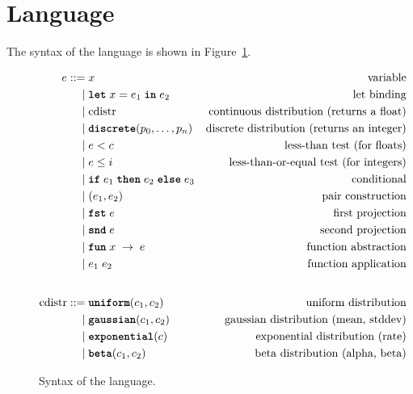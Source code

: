 \documentclass[acmsmall,screen,dvipsnames,x11names,nonacm,anonymous,review]{acmart}
\newcommand{\letkw}{\text{\ttfamily\bfseries let}}
\newcommand{\inkw}{\text{\ttfamily\bfseries in}}
\newcommand{\ifkw}{\text{\ttfamily\bfseries if}}
\newcommand{\thenkw}{\text{\ttfamily\bfseries then}}
\newcommand{\elsekw}{\text{\ttfamily\bfseries else}}
\newcommand{\uniform}{\text{\ttfamily\bfseries uniform}}
\newcommand{\discrete}{\text{\ttfamily\bfseries discrete}}
\newcommand{\gaussian}{\text{\ttfamily\bfseries gaussian}}
\newcommand{\exponential}{\text{\ttfamily\bfseries exponential}}
\newcommand{\betafn}{\text{\ttfamily\bfseries beta}} %
\newcommand{\fstkw}{\text{\ttfamily\bfseries fst}}
\newcommand{\sndkw}{\text{\ttfamily\bfseries snd}}
\newcommand{\funkw}{\text{\ttfamily\bfseries fun}}
\newcommand{\CDice}{\text{\scshape CDice}\xspace}
\begin{document}
\section{Language}

The syntax of the \CDice language is shown in Figure~\ref{fig:grammar}.

\begin{figure}[h]
\begin{align*}
e ::= &\; x                               & \text{variable} \\
    | &\; \letkw \; x = e_1\; \inkw \; e_2  & \text{let binding} \\
    | &\; \text{cdistr}                   & \text{continuous distribution (returns a float)} \\
    | &\; \discrete(p_0, \ldots, p_{n})      & \text{discrete distribution (returns an integer)} \\
    | &\; e < c                           & \text{less-than test (for floats)} \\
    | &\; e \leq i                           & \text{less-than-or-equal test (for integers)} \\
    | &\; \ifkw \; e_1\; \thenkw \; e_2\; \elsekw \; e_3 & \text{conditional} \\
    | &\; (e_1, e_2)                      & \text{pair construction} \\
    | &\; \fstkw \; e                       & \text{first projection} \\
    | &\; \sndkw \; e                       & \text{second projection} \\
    | &\; \funkw \; x \; \rightarrow \; e    & \text{function abstraction} \\
    | &\; e_1 \; e_2                      & \text{function application} \\
    \\[1ex] %
\text{cdistr} ::= &\; \uniform(c_1, c_2)      & \text{uniform distribution} \\
           | &\; \gaussian(c_1, c_2)   & \text{gaussian distribution (mean, stddev)} \\
           | &\; \exponential(c)      & \text{exponential distribution (rate)} \\
           | &\; \betafn(c_1, c_2)      & \text{beta distribution (alpha, beta)}
\end{align*}
\caption{Syntax of the \CDice language.}
\label{fig:grammar}
\end{figure}
\end{document}
